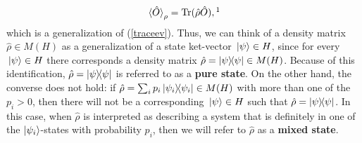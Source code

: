     \begin{equation}\label{expdensity}\ev*{\hat{O}}_\rho=\Tr(\hat{\rho}\hat{O}),\protect\footnotemark\end{equation}which is a generalization of (\ref{traceev}). Thus, we can think of a density matrix $\hat{\rho}\in M(H)$ as a generalization \label{genket} of a state ket-vector $\ket*{\psi}\in H$, since for every $\ket*{\psi}\in H$ there corresponds a density matrix $\hat{\rho}=\dyad{\psi}\in M(H)$. Because of this identification, $\hat{\rho}=\dyad{\psi}$ is referred to as a \textbf{pure state}. On the other hand, the converse does not hold: if $\hat{\rho}=\sum_i p_i\dyad{\psi_i}\in M(H)$ with more than one of the $p_i> 0$, then there will not be a corresponding $\ket*{\psi}\in H$ such that $\hat{\rho}=\dyad{\psi}$. In this case, when $\hat{\rho}$ is interpreted as describing a system that is definitely in one of the $\ket{\psi_i}$-states with probability $p_i$, then we will refer to $\hat{\rho}$ as a \textbf{mixed state}.\label{mixedstate}
